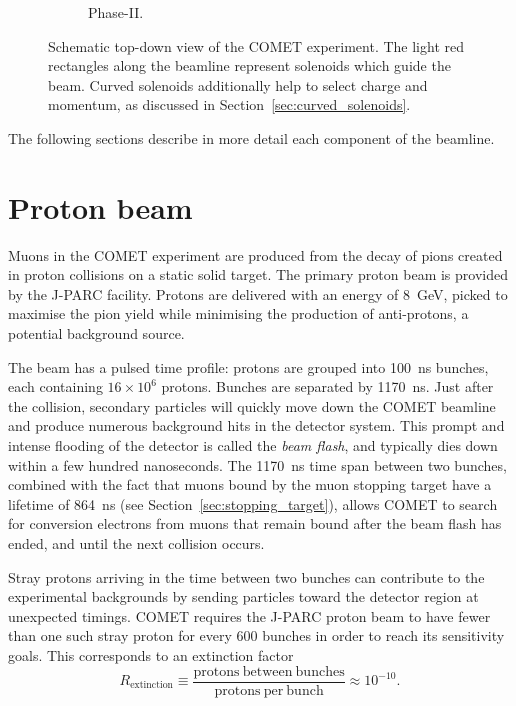 \begin{figure}
\begin{subfigure}[b]{0.49\textwidth}
        \caption{Phase-II.}
    \end{subfigure}
    \caption{ Schematic top-down view of the COMET experiment. The light red
        rectangles along the beamline represent solenoids which guide the beam.
        Curved solenoids additionally help to select charge and momentum, as
        discussed in Section~\ref{sec:curved_solenoids}.}
    \label{fig:comet_schematic}
\end{figure}

The following sections describe in more detail each component of the beamline.


\section{Proton beam}\label{sec:COMET_beam}
Muons in the COMET experiment are produced from the decay of pions created in
proton collisions on a static solid target. The primary proton beam is provided
by the J-PARC facility. Protons are delivered with an energy of \SI{8}{\GeV},
picked to maximise the pion yield while minimising the production of
anti-protons, a potential background source.

The beam has a pulsed time profile: protons are grouped into \SI{100}{\ns}
bunches, each containing $16\times 10^6$ protons. Bunches are separated by
\SI{1170}{\ns}. Just after the collision, secondary particles will quickly move
down the COMET beamline and produce numerous background hits in the detector
system. This prompt and intense flooding of the detector is called the
\emph{beam flash}, and typically dies down within a few hundred nanoseconds. The
\SI{1170}{\ns} time span between two bunches, combined with the fact that muons
bound by the muon stopping target have a lifetime of \SI{864}{\ns} (see
Section~\ref{sec:stopping_target}), allows COMET to search for conversion
electrons from muons that remain bound after the beam flash has ended, and until
the next collision occurs.



Stray protons arriving in the time between two bunches can contribute to the
experimental backgrounds by sending particles toward the detector region at
unexpected timings. COMET requires the J-PARC proton beam to have fewer than one
such stray proton for every 600 bunches in order to reach its sensitivity goals.
This corresponds to an extinction factor
$$
R_\mathrm{extinction} \equiv \frac{\mathrm{protons\ between\
bunches}}{\mathrm{protons\ per\ bunch}} \approx 10^{-10}.
$$

